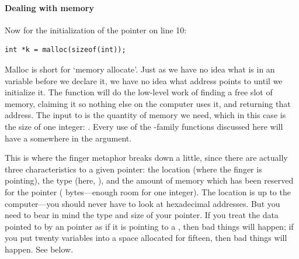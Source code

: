 \documentclass[12pt]{article}
\makeatletter
\def\cind#1{\index{#1@\cinline{#1}}\cinline{#1}}
\makeatother
\begin{document}
\paragraph{Dealing with memory}  
 
Now for the initialization of the pointer on line 10:
\begin{lstlisting}
int *k = malloc(sizeof(int));
\end{lstlisting}
Malloc is short for `memory allocate'. Just as we have no idea what
is in an  variable before we declare it, we have no
idea what address  points to until we initialize it. The
function  will do the low-level work of finding
a free slot of memory, claiming it so nothing else on the computer
uses it, and returning that address. The input to  is the
quantity of memory we need, which in this case is the size of one
integer: . Every use of the -family
functions discussed here will have a \cind{sizeof} somewhere in the
argument.

\index{\&}

This is where the finger metaphor breaks down a little, since there are actually three characteristics
to a given pointer: the location (where the finger is pointing), the type (here, ), and the
amount of memory which has been reserved for the pointer ( bytes---enough room for one
integer). The location is up to the computer---you should never have
to look at hexadecimal addresses. But you need to bear in mind the type
and size of your pointer. If you treat the data pointed to by an  pointer as if it is pointing to a , then bad things will
happen; if you put twenty variables into a space allocated for fifteen,
then bad things will happen. See below.
\end{document}
